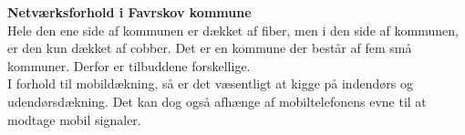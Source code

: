\textbf{Netværksforhold i Favrskov kommune}\\
Hele den ene side af kommunen er dækket af fiber, men i den side af kommunen, er den kun dækket af cobber. Det er en kommune der består af fem små kommuner. Derfor er tilbuddene forskellige.\\
I forhold til mobildækning, så er det væsentligt at kigge på indendørs og udendørsdækning. Det kan dog også afhænge af mobiltelefonens evne til at modtage mobil signaler.\\